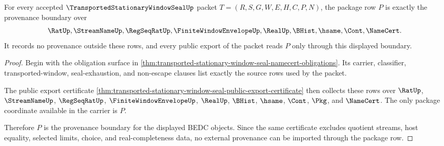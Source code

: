 \begin{theorem}
\label{thm:transported-stationary-window-seal-root-package-exactness}
For every accepted $\TransportedStationaryWindowSealUp$ packet $T=(R,S,G,W,E,H,C,P,N)$, the package row $P$ is exactly the provenance boundary over
$$
\begin{aligned}
  \RatUp,\StreamNameUp,\RegSeqRatUp,\FiniteWindowEnvelopeUp,\RealUp,
  \BHist,\hsame,\Cont,\NameCert .
\end{aligned}
$$
It records no provenance outside these rows, and every public export of the packet reads $P$ only through this displayed boundary.
\end{theorem}
\begin{proof}
Begin with the obligation surface in \autoref{thm:transported-stationary-window-seal-namecert-obligations}. Its carrier, classifier, transported-window, seal-exhaustion, and non-escape clauses list exactly the source rows used by the packet.

The public export certificate \autoref{thm:transported-stationary-window-seal-public-export-certificate} then collects these rows over $\RatUp$, $\StreamNameUp$, $\RegSeqRatUp$, $\FiniteWindowEnvelopeUp$, $\RealUp$, $\BHist$, $\hsame$, $\Cont$, $\Pkg$, and $\NameCert$. The only package coordinate available in the carrier is $P$.

Therefore $P$ is the provenance boundary for the displayed BEDC objects. Since the same certificate excludes quotient streams, host equality, selected limits, choice, and real-completeness data, no external provenance can be imported through the package row.
\end{proof}

